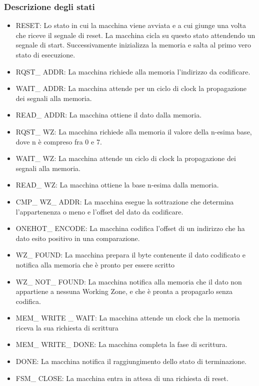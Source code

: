\documentclass{article}
\begin{document}
\subsubsection{Descrizione degli stati}

\begin{itemize}

\item RESET: Lo stato in cui la macchina viene avviata e a cui giunge una volta che riceve il segnale di reset. La macchina cicla su questo stato attendendo un segnale di start. Successivamente inizializza la memoria e salta al primo vero stato di esecuzione.

\item RQST\_ ADDR: La macchina richiede alla memoria l'indirizzo da codificare.

\item WAIT\_ ADDR: La macchina attende per un ciclo di clock la propagazione dei segnali alla memoria.

\item READ\_ ADDR: La macchina ottiene il dato dalla memoria.

\item RQST\_ WZ: La macchina richiede alla memoria il valore della n-esima base, dove n è compreso fra 0 e 7.

\item WAIT\_ WZ: La macchina attende un ciclo di clock la propagazione dei segnali alla memoria.

\item READ\_ WZ: La macchina ottiene la base n-esima dalla memoria.

\item CMP\_ WZ\_ ADDR: La macchina esegue la sottrazione che determina l'appartenenza o meno e l'offset del dato da codificare.

\item ONEHOT\_ ENCODE: La macchina codifica l'offset di un indirizzo che ha dato esito positivo in una comparazione.

\item WZ\_ FOUND: La macchina prepara il byte contenente il dato codificato e notifica alla memoria che è pronto per essere scritto

\item WZ\_ NOT\_ FOUND: La macchina notifica alla memoria che il dato non appartiene a nessuna Working Zone, e che è pronta a propagarlo senza codifica.

\item MEM\_ WRITE \_ WAIT: La macchina attende un clock che la memoria riceva la sua richiesta di scrittura

\item MEM\_ WRITE\_ DONE: La macchina completa la fase di scrittura.

\item DONE: La macchina notifica il raggiungimento dello stato di terminazione.

\item FSM\_ CLOSE: La macchina entra in attesa di una richiesta di reset.

\end{itemize}
\end{document}
